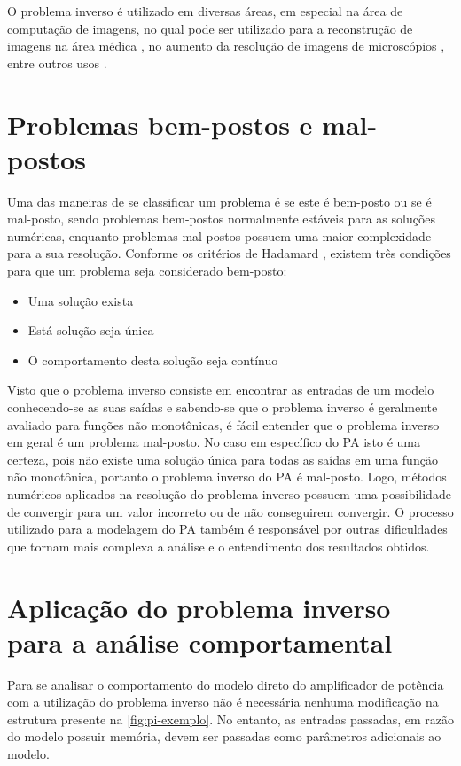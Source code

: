 O problema inverso é utilizado em diversas áreas, em especial na área de computação de imagens, no qual pode ser utilizado para a reconstrução de imagens na área médica \cite{mccann2016fast}, no aumento da resolução de imagens de microscópios \cite{kellman2019data}, entre outros usos \cite{9084378}.

\section{Problemas bem-postos e mal-postos} \label{sec:pi-posto}
Uma das maneiras de se classificar um problema é se este é bem-posto ou se é mal-posto, sendo problemas bem-postos normalmente estáveis para as soluções numéricas, enquanto problemas mal-postos possuem uma maior complexidade para a sua resolução. Conforme os critérios de Hadamard \cite{hadamard1902problemes}, existem três condições para que um problema seja considerado bem-posto:
\begin{itemize}
  \item Uma solução exista
  \item Está solução seja única
  \item O comportamento desta solução seja contínuo
\end{itemize}

Visto que o problema inverso consiste em encontrar as entradas de um modelo conhecendo-se as suas saídas e sabendo-se que o problema inverso é geralmente avaliado para funções não monotônicas, é fácil entender que o problema inverso em geral é um problema mal-posto.
No caso em específico do PA isto é uma certeza, pois não existe uma solução única para todas as saídas em uma função não monotônica, portanto o problema inverso do PA é mal-posto. Logo, métodos numéricos aplicados na resolução do problema inverso possuem uma possibilidade de convergir para um valor incorreto ou de não conseguirem convergir. O processo utilizado para a modelagem do PA também é responsável por outras dificuldades que tornam mais complexa a análise e o entendimento dos resultados obtidos.

\section{Aplicação do problema inverso para a análise comportamental} \label{sec:pi-app}
Para se analisar o comportamento do modelo direto do amplificador de potência com a utilização do problema inverso não é necessária nenhuma modificação na estrutura presente na \autoref{fig:pi-exemplo}. No entanto, as entradas passadas, em razão do modelo possuir memória, devem ser passadas como parâmetros adicionais ao modelo.
